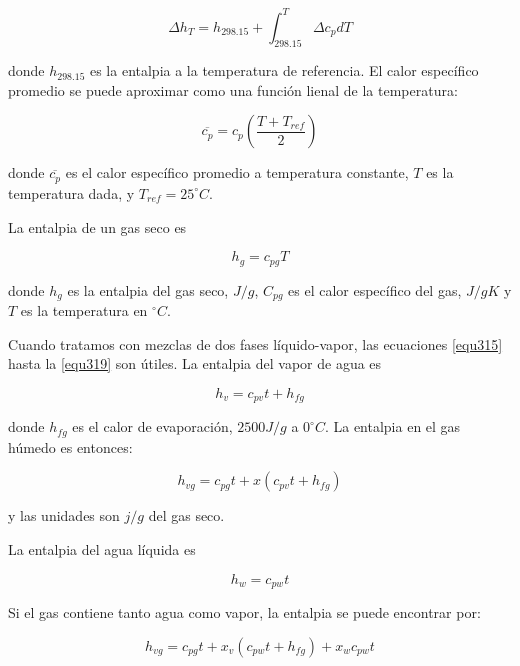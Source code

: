 \documentclass[12pt]{book}
\theoremstyle{definition}
\theoremstyle{remark}
\theoremstyle{plain}
\begin{document}
\begin{equation}
 \label{equ317}
\Delta h_T = h_{298.15}+ \int_{298.15}^T \Delta c_p d T
\end{equation}

donde $h_{298.15}$ es la entalpia a la temperatura de referencia. El calor específico
promedio se puede aproximar como una función lienal de la temperatura:

\begin{equation}
 \label{equ318}
\overline{c_p}= c_p \left ( \frac{T+T_{ref}}{2} \right )
\end{equation}

donde $\overline{c_p}$ es el calor específico promedio a temperatura constante, $T$ 
es la temperatura dada, y $T_{ref}=25^{\circ} C$.

La entalpia de un gas seco es

\begin{equation}
 \label{equ319}
h_g = c_{pg} T
\end{equation}

donde $h_g$ es la entalpia del gas seco, $J/g$, $C_{pg}$ es el calor específico del gas,
$J/gK$ y $T$ es la temperatura en $^{\circ}C$.

Cuando tratamos con mezclas de dos fases líquido-vapor, las ecuaciones \ref{equ315} hasta
la \ref{equ319} son útiles. La entalpia del vapor de agua es

\begin{equation}
 \label{equ320}
h_v = c_{pv}t+h_{fg}
\end{equation}

donde $h_{fg}$ es el calor de evaporación, $2500 J/g$ a $0 ^\circ C$. La entalpia 
en el gas húmedo es entonces:

\begin{equation}
 \label{equ321}
h_{vg} = c_{pg} t + x(c_{pv} t + h_{fg})
\end{equation}

y las unidades son $j/g$ del gas seco.

La entalpia del agua líquida es

\begin{equation}
 \label{equ322}
h_w = c_{pw}t
\end{equation}

Si el gas contiene tanto agua como vapor, la entalpia se puede encontrar por:

\begin{equation}
 \label{equ323}
h_{vg} = c_{pg}t + x_{v}(c_{pw}t+h_{fg})+x_{w}c_{pw}t
\end{equation}
\end{document}
